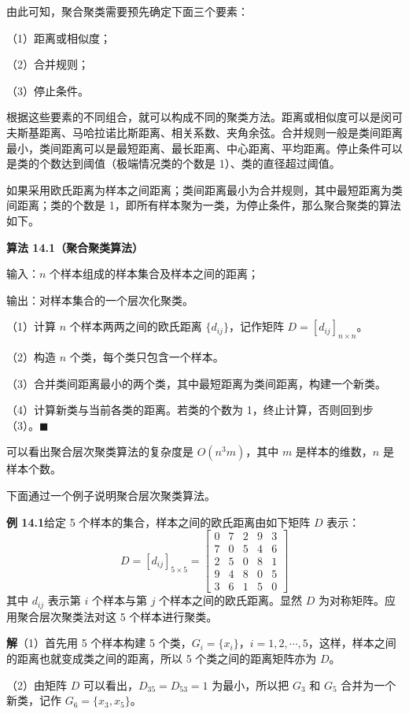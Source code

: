 \documentclass[UTF8, 12pt, fontset=fandol, oneside]{ctexart}
\begin{document}
由此可知，聚合聚类需要预先确定下面三个要素：

（1）距离或相似度；

（2）合并规则；

（3）停止条件。

根据这些要素的不同组合，就可以构成不同的聚类方法。距离或相似度可以是闵可夫斯基距离、马哈拉诺比斯距离、相关系数、夹角余弦。合并规则一般是类间距离最小，类间距离可以是最短距离、最长距离、中心距离、平均距离。停止条件可以是类的个数达到阈值（极端情况类的个数是 1）、类的直径超过阈值。

如果采用欧氏距离为样本之间距离；类间距离最小为合并规则，其中最短距离为类间距离；类的个数是 1，即所有样本聚为一类，为停止条件，那么聚合聚类的算法如下。

\noindent\textbf{算法 14.1（聚合聚类算法）}

输入：$n$ 个样本组成的样本集合及样本之间的距离；

输出：对样本集合的一个层次化聚类。

（1）计算 $n$ 个样本两两之间的欧氏距离 $\{d_{ij}\}$，记作矩阵 $D=[d_{ij}]_{n\times n}$。

（2）构造 $n$ 个类，每个类只包含一个样本。

（3）合并类间距离最小的两个类，其中最短距离为类间距离，构建一个新类。

（4）计算新类与当前各类的距离。若类的个数为 1，终止计算，否则回到步（3）。\hfill$\blacksquare$

可以看出聚合层次聚类算法的复杂度是 $O(n^3m)$，其中 $m$ 是样本的维数，$n$ 是样本个数。

下面通过一个例子说明聚合层次聚类算法。

\noindent\textbf{例 14.1}\quad 给定 5 个样本的集合，样本之间的欧氏距离由如下矩阵 $D$ 表示：
\[
D=[d_{ij}]_{5\times 5}=
\begin{bmatrix}
0 & 7 & 2 & 9 & 3\\
7 & 0 & 5 & 4 & 6\\
2 & 5 & 0 & 8 & 1\\
9 & 4 & 8 & 0 & 5\\
3 & 6 & 1 & 5 & 0
\end{bmatrix}
\]
其中 $d_{ij}$ 表示第 $i$ 个样本与第 $j$ 个样本之间的欧氏距离。显然 $D$ 为对称矩阵。应用聚合层次聚类法对这 5 个样本进行聚类。

\noindent\textbf{解}\quad （1）首先用 5 个样本构建 5 个类，$G_i=\{x_i\}$，$i=1,2,\cdots,5$，这样，样本之间的距离也就变成类之间的距离，所以 5 个类之间的距离矩阵亦为 $D$。

（2）由矩阵 $D$ 可以看出，$D_{35}=D_{53}=1$ 为最小，所以把 $G_3$ 和 $G_5$ 合并为一个新类，记作 $G_6=\{x_3,x_5\}$。
\end{document}
